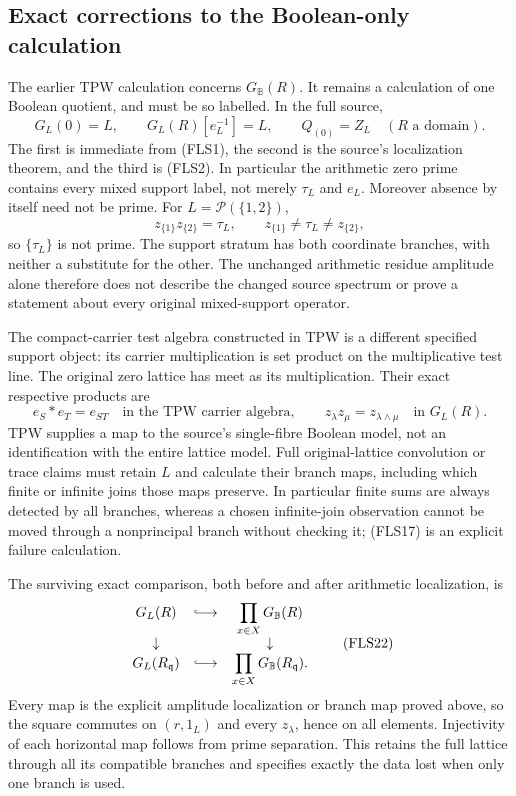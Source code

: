 \documentclass[11pt]{article}
\begin{document}
\subsection{Exact corrections to the Boolean-only calculation}

The earlier TPW calculation concerns $G_{\mathbb B}(R)$.
It remains a calculation of one Boolean quotient, and
must be so labelled. In the full source,
\[
G_L(0)=L,\qquad G_L(R)[e_L^{-1}]=L,\qquad
Q_{(0)}=Z_L\quad(R\text{ a domain}).
\tag{FLS19}
\]
The first is immediate from (FLS1), the second is the
source's localization theorem, and the third is (FLS2).
In particular the arithmetic zero prime contains every
mixed support label, not merely $\tau_L$ and $e_L$.
Moreover absence by itself need not be prime. For
$L=\mathcal P(\{1,2\})$,
\[
z_{\{1\}}z_{\{2\}}=\tau_L,
\qquad z_{\{1\}}\ne\tau_L\ne z_{\{2\}},
\tag{FLS20}
\]
so $\{\tau_L\}$ is not prime. The support stratum has
both coordinate branches, with neither a substitute for
the other. The unchanged arithmetic residue amplitude
alone therefore does not describe the changed source
spectrum or prove a statement about every original
mixed-support operator.

The compact-carrier test algebra constructed in TPW is
a different specified support object: its carrier
multiplication is set product on the multiplicative
test line. The original zero lattice has meet as its
multiplication. Their exact respective products are
\[
e_S*e_T=e_{ST}\quad\text{in the TPW carrier algebra},
\qquad z_\lambda z_\mu=z_{\lambda\wedge\mu}
\quad\text{in }G_L(R).
\tag{FLS21}
\]
TPW supplies a map to the source's single-fibre Boolean
model, not an identification with the entire lattice
model. Full original-lattice convolution or trace claims
must retain $L$ and calculate their branch maps, including
which finite or infinite joins those maps preserve.
In particular finite sums are always detected by all
branches, whereas a chosen infinite-join observation
cannot be moved through a nonprincipal branch without
checking it; (FLS17) is an explicit failure calculation.

The surviving exact comparison, both before and after
arithmetic localization, is
\[
\begin{array}{ccc}
G_L(R)&\lhook\joinrel\longrightarrow&\displaystyle\prod_{x\in X}G_{\mathbb B}(R)\\
\downarrow&&\downarrow\\
G_L(R_{\mathfrak q})&\lhook\joinrel\longrightarrow&
\displaystyle\prod_{x\in X}G_{\mathbb B}(R_{\mathfrak q}).
\end{array}
\tag{FLS22}
\]
Every map is the explicit amplitude localization or
branch map proved above, so the square commutes on
$(r,1_L)$ and every $z_\lambda$, hence on all elements.
Injectivity of each horizontal map follows from prime
separation. This retains the full lattice through all
its compatible branches and specifies exactly the data
lost when only one branch is used.
\end{document}
